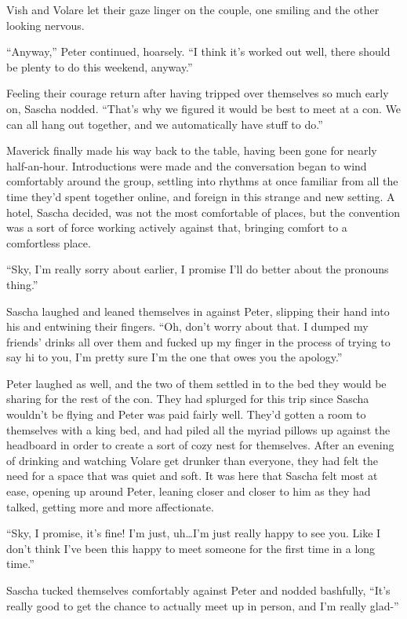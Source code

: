 Vish and Volare let their gaze linger on the couple, one smiling and the other looking nervous.

``Anyway,'' Peter continued, hoarsely. ``I think it's worked out well, there should be plenty to do this weekend, anyway.''

Feeling their courage return after having tripped over themselves so much early on, Sascha nodded. ``That's why we figured it would be best to meet at a con. We can all hang out together, and we automatically have stuff to do.''

Maverick finally made his way back to the table, having been gone for nearly half-an-hour. Introductions were made and the conversation began to wind comfortably around the group, settling into rhythms at once familiar from all the time they'd spent together online, and foreign in this strange and new setting. A hotel, Sascha decided, was not the most comfortable of places, but the convention was a sort of force working actively against that, bringing comfort to a comfortless place.

\secdiv

``Sky, I'm really sorry about earlier, I promise I'll do better about the pronouns thing.''

Sascha laughed and leaned themselves in against Peter, slipping their hand into his and entwining their fingers. ``Oh, don't worry about that. I dumped my friends' drinks all over them and fucked up my finger in the process of trying to say hi to you, I'm pretty sure I'm the one that owes you the apology.''

Peter laughed as well, and the two of them settled in to the bed they would be sharing for the rest of the con. They had splurged for this trip since Sascha wouldn't be flying and Peter was paid fairly well. They'd gotten a room to themselves with a king bed, and had piled all the myriad pillows up against the headboard in order to create a sort of cozy nest for themselves. After an evening of drinking and watching Volare get drunker than everyone, they had felt the need for a space that was quiet and soft. It was here that Sascha felt most at ease, opening up around Peter, leaning closer and closer to him as they had talked, getting more and more affectionate.

``Sky, I promise, it's fine! I'm just, uh\ldots{}I'm just really happy to see you. Like I don't think I've been this happy to meet someone for the first time in a long time.''

Sascha tucked themselves comfortably against Peter and nodded bashfully, ``It's really good to get the chance to actually meet up in person, and I'm really glad-''

